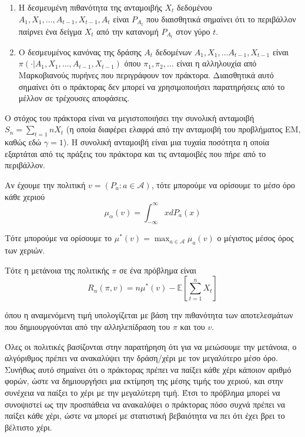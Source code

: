 \begin{enumerate}
    \item Η δεσμευμένη πιθανότητα της ανταμοιβής $X_t$ δεδομένου $A_1, X_1, \ldots, A_{t-1}, X_{t-1}, A_t$ είναι $P_{A_t}$ που διαισθητικά σημαίνει ότι το περιβάλλον παίρνει ένα δείγμα $X_t$ από την κατανομή $P_{A_t}$ στον γύρο $t$.
    \item Ο δεσμευμένος κανόνας της δράσης $A_t$ δεδομένων $A_1, X_1, \ldots A_{t-1}, X_{t-1}$ είναι \\$π(\cdot|A_1,X_1, \ldots,A_{t-1},X_{t-1})$ όπου $π_1, π_2, \ldots$ είναι η αλληλουχία από Μαρκοβιανούς πυρήνες που περιγράφουν τον πράκτορα. Διαισθητικά αυτό σημαίνει ότι ο πράκτορας δεν μπορεί να χρησιμοποιήσει παρατηρήσεις από το μέλλον σε τρέχουσες αποφάσεις.
\end{enumerate}

Ο στόχος του πράκτορα είναι να μεγιστοποιήσει την συνολική ανταμοιβή $S_n = \sum_{t=1}{n}X_t$ (η οποία διαφέρει ελαφρά από την ανταμοιβή του προβλήματος ΕΜ, καθώς εδώ $γ=1$). Η συνολική ανταμοιβή είναι μια τυχαία ποσότητα η οποία εξαρτάται από τις πράξεις του πράκτορα και τις ανταμοιβές που πήρε από το περιβάλλον.

Αν έχουμε την πολιτική $v = (P_a : a \in \mathcal{A})$, τότε μπορούμε να ορίσουμε το μέσο όρο κάθε χεριού
\begin{equation*}
    μ_α(v) = \int_{-\infty}^{\infty}xdP_a(x)
\end{equation*}

Τότε μπορούμε να ορίσουμε το $μ^*(v) = \max_{a\in \mathcal{A}}μ_a(v)$ ο μέγιστος μέσος όρος των χεριών.

Τότε η μετάνοια της πολιτικής $π$ σε ένα πρόβλημα  είναι
\begin{equation}
    R_n(π,v) = nμ^*(v) - \mathbb{E}\left[ \sum_{t=1}^{n} X_t \right]
\end{equation}

όπου η αναμενόμενη τιμή υπολογίζεται με βάση την πιθανότητα των αποτελεσμάτων που δημιουργούνται από την αλληλεπίδραση του $π$ και του $v$.

Όλες οι πολιτικές βασίζονται στην παρατήρηση ότι για να μειώσουμε την μετάνοια, ο αλγόριθμος πρέπει να ανακαλύψει την δράση/χέρι με τον μεγαλύτερο μέσο όρο. Συνήθως αυτό σημαίνει ότι ο πράκτορας πρέπει να παίξει κάθε χέρι κάποιον αριθμό φορών, ώστε να δημιουργήσει μια εκτίμηση της μέσης τιμής του χεριού, και στην συνέχεια να παίξει το χέρι με την μεγαλύτερη τιμή. Έτσι το πρόβλημα μπορεί να συνοψιστεί ως την προσπάθεια να ανακαλύψει ο πράκτορας πόσο συχνά πρέπει να παίξει κάθε χέρι, ώστε να μπορεί με στατιστική βεβαιότητα να πει ότι έχει βρει το βέλτιστο χέρι.

